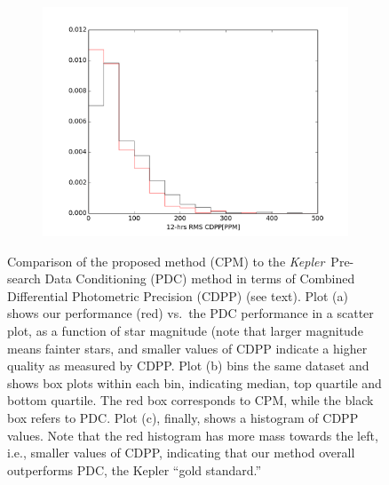 \documentclass[12pt, preprint]{aastex}
\newcommand{\project}[1]{\textsl{#1}}
\newcommand{\Kepler}{\project{Kepler}}
\begin{document}
\begin{figure}[htb]
\begin{subfigure}[htb]{0.33\columnwidth}
\includegraphics[width=\columnwidth]{pdc_cdpp12_hist_r100}
\caption{}
\end{subfigure}
\caption{\label{cdpp} Comparison of the proposed method (CPM) to the \Kepler\ Pre-search Data Conditioning (PDC) method 
in terms of Combined Differential Photometric Precision (CDPP) (see text). 
Plot (a) shows our performance (red) vs.\ the PDC performance in a scatter plot, as a function of star magnitude 
(note that larger magnitude means fainter stars, and smaller values of CDPP indicate a higher quality as measured by CDPP.  
Plot (b) bins the same dataset and shows box plots within each bin, indicating median, top quartile and bottom quartile. 
The red box corresponds to CPM, while the black box refers to PDC. Plot (c), finally, shows a histogram of CDPP values. 
Note that the red histogram has more mass towards the left, i.e., smaller values of CDPP, indicating that our method overall outperforms PDC, the Kepler ``gold standard.'' 
}
\end{figure}

\clearpage
\end{document}
